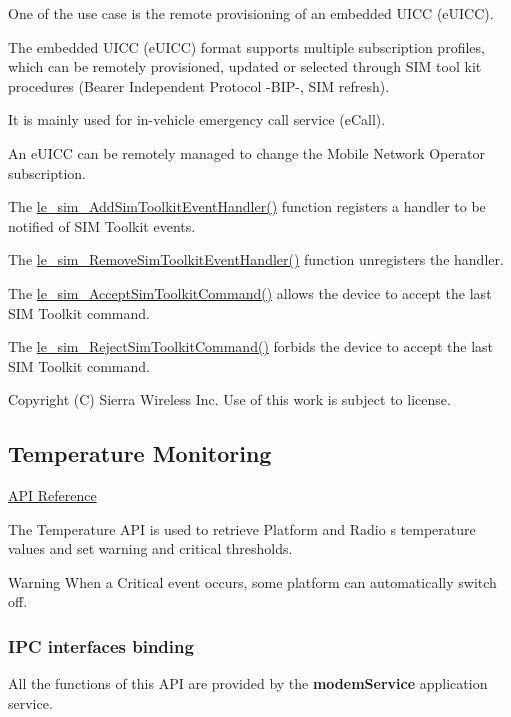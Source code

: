 One of the use case is the remote provisioning of an embedded U\+I\+C\+C (e\+U\+I\+C\+C).

The embedded U\+I\+C\+C (e\+U\+I\+C\+C) format supports multiple subscription profiles, which can be remotely provisioned, updated or selected through S\+I\+M tool kit procedures (Bearer Independent Protocol -\/\+B\+I\+P-\/, S\+I\+M refresh).

It is mainly used for in-\/vehicle emergency call service (e\+Call).

An e\+U\+I\+C\+C can be remotely managed to change the Mobile Network Operator subscription.

The \hyperlink{le__sim__interface_8h_a85577728a34d70801cbb4deb8efd75d5}{le\+\_\+sim\+\_\+\+Add\+Sim\+Toolkit\+Event\+Handler()} function registers a handler to be notified of S\+I\+M Toolkit events.

The \hyperlink{le__sim__interface_8h_a487be241cae0657f96bcc44d0f8fab5a}{le\+\_\+sim\+\_\+\+Remove\+Sim\+Toolkit\+Event\+Handler()} function unregisters the handler.

The \hyperlink{le__sim__interface_8h_a8cc75a17466446c19c5bd941b1360e0e}{le\+\_\+sim\+\_\+\+Accept\+Sim\+Toolkit\+Command()} allows the device to accept the last S\+I\+M Toolkit command.

The \hyperlink{le__sim__interface_8h_a8cbdc50d62ddd5ea80386d27e16d954f}{le\+\_\+sim\+\_\+\+Reject\+Sim\+Toolkit\+Command()} forbids the device to accept the last S\+I\+M Toolkit command.





Copyright (C) Sierra Wireless Inc. Use of this work is subject to license. \hypertarget{c_temp}{}\subsection{Temperature Monitoring}\label{c_temp}
\hyperlink{le__temp__interface_8h}{A\+P\+I Reference}





The Temperature A\+P\+I is used to retrieve Platform and Radio \textquotesingle{}s temperature values and set warning and critical thresholds.

\begin{DoxyWarning}{Warning}
When a Critical event occurs, some platform can automatically switch off.
\end{DoxyWarning}
\hypertarget{c_temp_le_temp_binding}{}\subsubsection{I\+P\+C interfaces binding}\label{c_temp_le_temp_binding}
All the functions of this A\+P\+I are provided by the {\bfseries modem\+Service} application service.

